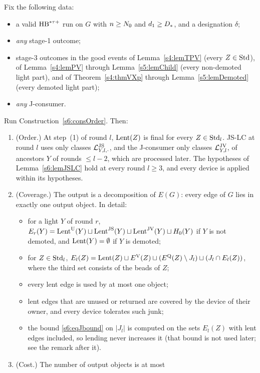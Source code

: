 \begin{theorem}[Theorem MIX-C: the assembly with $\mathcal V=\emptyset$, deterministic form]\label{s6:thmMIXC}
Fix the following data:
\begin{itemize}
\item a valid $\mathrm{HB}^{*\tau{+}}$ run on $G$ with $n\ge N_{0}$ and $d_1\ge D_{*}$, and a designation $\delta$;
\item \emph{any} stage-1 outcome;
\item stage-3 outcomes in the good events of Lemma~\ref{s4:lemTPV} (every $Z\in\mathrm{Std}$), of Lemma~\ref{s4:lemPV} through Lemma~\ref{s5:lemChild} (every non-demoted light part), and of Theorem~\ref{s4:thmVXp} through Lemma~\ref{s5:lemDemoted} (every demoted light part);
\item \emph{any} J-consumer.
\end{itemize}
Run Construction~\ref{s6:consOrder}. Then:
\begin{enumerate}
\item[(a)] (Order.) At step~(1) of round $l$, $\mathrm{Lent}(Z)$ is final for every $Z\in\mathrm{Std}_l$. JS-LC at round $l$ uses only classes $\mathcal{L}^{\mathrm{JS}}_{Y,l,\cdot}$, and the J-consumer only classes $\mathcal{L}^{\mathrm{JV}}_{Y,l}$, of ancestors $Y$ of rounds $\le l-2$, which are processed later. The hypotheses of Lemma~\ref{s6:lemJSLC} hold at every round $l\ge3$, and every device is applied within its hypotheses.
\item[(b)] (Coverage.) The output is a decomposition of $E(G)$: every edge of $G$ lies in exactly one output object. In detail:
  \begin{itemize}
  \item for a light $Y$ of round $r$, $E_r(Y)=\mathrm{Lent}^{\mathrm{U}}(Y)\sqcup\mathrm{Lent}^{\mathrm{JS}}(Y)\sqcup\mathrm{Lent}^{\mathrm{JV}}(Y)\sqcup H_0(Y)$ if $Y$ is not demoted, and $\mathrm{Lent}(Y)=\emptyset$ if $Y$ is demoted;
  \item for $Z\in\mathrm{Std}_l$, $E_l(Z)=\mathrm{Lent}(Z)\sqcup E^{\mathrm{V}}(Z)\sqcup(E^{\mathrm{Q}}(Z)\setminus J_l)\sqcup(J_l\cap E_l(Z))$, where the third set consists of the beads of $Z$;
  \item every lent edge is used by at most one object;
  \item lent edges that are unused or returned are covered by the device of their owner, and every device tolerates such junk;
  \item the bound \eqref{s6:eqJbound} on $|J_l|$ is computed on the sets $E_l(Z)$ with lent edges included, so lending never increases it (that bound is not used later; see the remark after it).
  \end{itemize}
\item[(c)] (Cost.) The number of output objects is at most

\end{enumerate}
\end{theorem}
